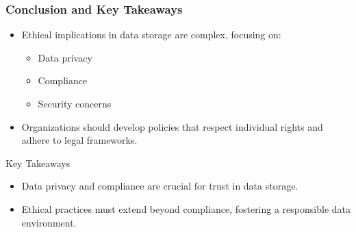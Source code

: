 \documentclass[aspectratio=169]{beamer}
\begin{document}
\begin{frame}[fragile]
    \frametitle{Conclusion and Key Takeaways}
    \begin{itemize}
        \item Ethical implications in data storage are complex, focusing on:
            \begin{itemize}
                \item Data privacy
                \item Compliance
                \item Security concerns
            \end{itemize}
        \item Organizations should develop policies that respect individual rights and adhere to legal frameworks.
    \end{itemize}
    
    \begin{block}{Key Takeaways}
        \begin{itemize}
            \item Data privacy and compliance are crucial for trust in data storage.
            \item Ethical practices must extend beyond compliance, fostering a responsible data environment.
        \end{itemize}
    \end{block}
\end{frame}
\end{document}
